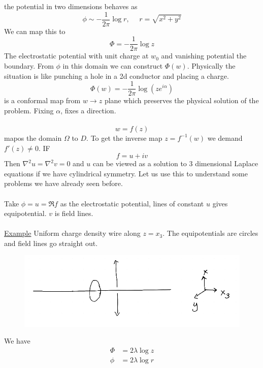 \documentclass[a4paper,12pt]{article}
\begin{document}
the potential in two dimensions behaves as
\begin{equation}
\phi\sim -\frac{1}{2\pi}\log r,~~~~~~r=\sqrt{x^2+y^2}
\end{equation}
We can map this to
\begin{equation}
	\Phi= -\frac{1}{2\pi}\log z
\end{equation}
The electrostatic potential with unit charge at $w_0$ and vanishing potential the boundary. From  $\phi$ in this domain we can construct $\Phi(w)$. Physically the situation is like punching a hole in a 2d conductor and placing a charge.
\begin{equation}
\Phi(w)=-\frac{1}{2\pi}\log (ze^{i\alpha})
\end{equation} 
is a conformal map from $w\to z$ plane which preserves the physical solution of the problem. Fixing $\alpha$, fixes a direction.\\\\
\begin{equation}
w=f(z)
\end{equation}
mapos the domain $\Omega$ to $D$. To get the inverse map $z=f^{-1}(w)$ we demand $f'(z)\neq 0$. IF
\begin{equation}
f=u+iv
\end{equation}
Then $\nabla^2u=\nabla^2 v=0$ and $u$ can be viewed as a solution to 3 dimensional Laplace equations if we have cylindrical symmetry. Let us use this to understand some problems we have already seen before.\\\\
Take $\phi=u= \Re f$ as the electrostatic potential, lines of constant $u$ gives equipotential. $v$ is field lines.\\\\
\underline{Example}
Uniform charge density wire along $z=x_3$. The equipotentials are circles and field lines go straight out.
\begin{figure}[H]
	\centering
	\includegraphics[width=0.7\linewidth]{4}
	\caption{}
	\label{fig:4}
\end{figure}
We have
\begin{equation}
\begin{aligned}
\Phi&=2\lambda \log z\\
\phi&=2\lambda \log r
\end{aligned}
\end{equation}
\end{document}
